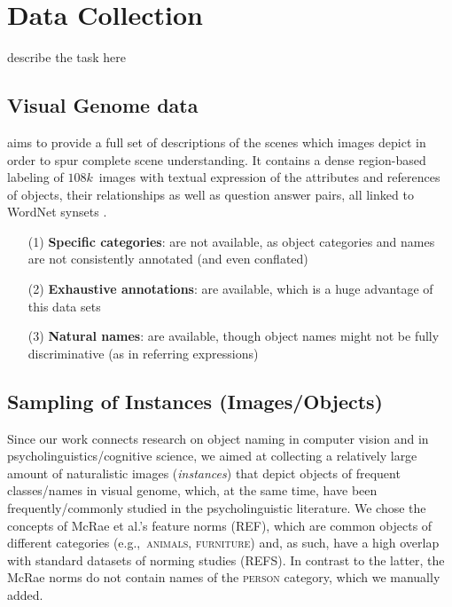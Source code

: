 \section{Data Collection}
\label{sec:task}


describe the task here

\subsection{Visual Genome data}


\vgenome \cite{krishna2016visualgenome} aims to provide a full set of descriptions of the scenes which images depict in order to spur complete scene understanding. 
It contains a dense region-based labeling of $108k$~images with textual expression of the attributes and references of objects, their relationships as well as question answer pairs, all linked to WordNet synsets \cite[see below]{fellbaum1998wordnet}. 


\begin{itemize}
     		\item[(1)] \textbf{Specific categories}: are not available, as object categories and names are not consistently annotated (and even conflated)
				\item[(2)] \textbf{Exhaustive annotations}: are available, which is a huge advantage of this data sets
		   \item[(3)] \textbf{Natural names}: are available, though object names might not be fully discriminative (as in referring expressions)

\end{itemize}

\subsection{Sampling of Instances (Images/Objects)}
Since our work connects research on object naming in computer vision and in psycholinguistics/cognitive science, we aimed at collecting a relatively large amount of naturalistic images (\textit{instances}) that depict objects of frequent classes/names in visual genome, which, at the same time, have been frequently/commonly studied in the psycholinguistic literature. 
We chose the concepts of McRae et al.'s feature norms (REF), which are common objects of different categories (e.g.,~\textsc{animals}, \textsc{furniture}) and, as such, have a high overlap with standard datasets of norming studies (REFS).
In contrast to the latter, the McRae norms do not contain names of the \textsc{person} category, which we manually added. 

